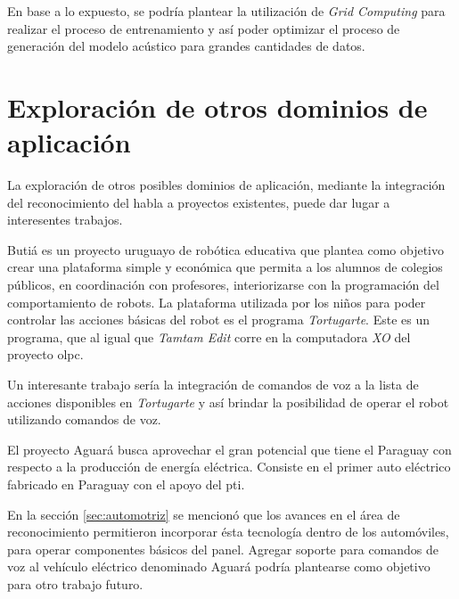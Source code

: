 En base a lo expuesto, se podr\'ia plantear la utilizaci\'on de \emph{Grid Computing} para realizar el proceso de entrenamiento y as\'i
poder optimizar el proceso de generaci\'on del modelo ac\'ustico para grandes cantidades de datos.

\section{Exploración de otros dominios de aplicación}
La exploración de otros posibles dominios de aplicación, mediante la integraci\'on del reconocimiento del habla a proyectos existentes, puede dar lugar a interesentes trabajos.

Buti\'a es un proyecto uruguayo de rob\'otica educativa \cite{RoboticaEducativa} que plantea como objetivo 
crear una plataforma simple y econ\'omica que permita a los alumnos de colegios p\'ublicos,
en coordinaci\'on con profesores, interiorizarse con la programaci\'on del comportamiento de robots\cite{Butia}.
La plataforma utilizada por los ni\~nos para poder controlar las acciones b\'asicas del robot es el programa
\emph{Tortugarte}. Este es un programa, que al igual que \emph{Tamtam Edit} corre en la computadora \emph{XO} del
proyecto \gls{olpc}.

Un interesante trabajo ser\'ia la integraci\'on de comandos de voz a la lista de acciones disponibles 
en \emph{Tortugarte} y as\'i brindar la posibilidad de operar el robot utilizando comandos de voz.

El proyecto Aguar\'a busca aprovechar el gran potencial que tiene el Paraguay con respecto a la producci\'on de
energ\'ia el\'ectrica. Consiste en el primer auto el\'ectrico fabricado en Paraguay con el apoyo del \gls{pti}. 

En la sección \ref{sec:automotriz} se mencion\'o que los avances en el \'area de reconocimiento
permitieron incorporar \'esta tecnolog\'ia dentro de los autom\'oviles, para operar componentes b\'asicos del panel.
Agregar soporte para comandos de voz al veh\'iculo el\'ectrico denominado Aguar\'a podría plantearse como objetivo
para otro trabajo futuro.

